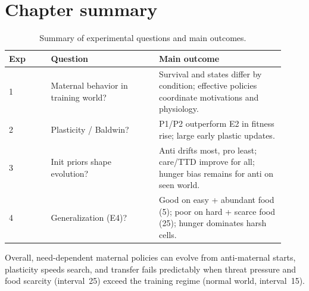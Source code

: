 \section{Chapter summary}

\begin{table}[H]
  \centering
  \caption{Summary of experimental questions and main outcomes.}
  \label{tab:exp_summary}
  \small
  \begin{tabular}{p{0.14\linewidth}p{0.36\linewidth}p{0.42\linewidth}}
    \toprule
    \textbf{Exp} & \textbf{Question} & \textbf{Main outcome} \\
    \midrule
    1 & Maternal behavior in training world? &
    Survival and states differ by condition; effective policies coordinate motivations and physiology. \\
    2 & Plasticity / Baldwin? &
    P1/P2 outperform E2 in fitness rise; large early plastic updates. \\
    3 & Init priors shape evolution? &
    Anti drifts most, pro least; care/TTD improve for all; hunger bias remains for anti on seen world. \\
    4 & Generalization (E4)? &
  Good on easy + abundant food (5); poor on hard + scarce food (25); hunger dominates harsh cells. \\
    \bottomrule
  \end{tabular}
\end{table}

Overall, need-dependent maternal policies can evolve from anti-maternal starts, plasticity speeds search, and transfer fails predictably when threat pressure and food scarcity (interval~25) exceed the training regime (normal world, interval~15).
